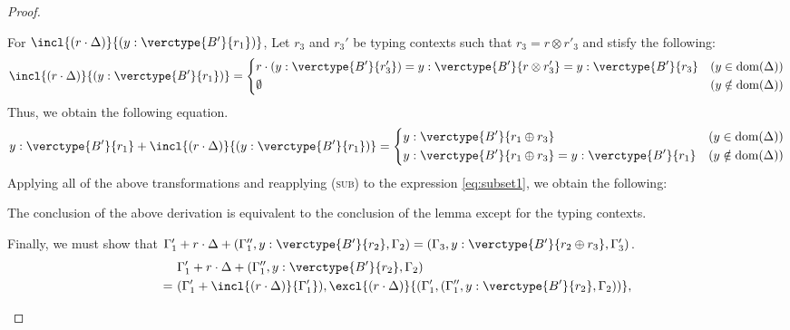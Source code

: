 \begin{proof}
\begin{itemize}
\begin{itemize}
For $\incl{(r\cdot\Delta)}{(y:\verctype{B'}{r_1})}$,  Let $r_3$ and $r_3'$ be typing contexts such that $r_3=r\otimes r'_3$ and stisfy the following:
\begin{align*}
\incl{(r\cdot\Delta)}{(y:\verctype{B'}{r_1})} =
\left\{
\begin{aligned}
    & r\cdot(y:\verctype{B'}{r'_3}) = y:\verctype{B'}{r\otimes r'_3} = y:\verctype{B'}{r_3}  & (y \in \mathrm{dom}(\Delta))\\
    & \emptyset & (y \notin \mathrm{dom}(\Delta))
\end{aligned}
\right.
\end{align*}
Thus, we obtain the following equation.
\begin{align}
\label{eq:subset2}
y:\verctype{B'}{r_1} + \incl{(r\cdot\Delta)}{(y:\verctype{B'}{r_1})} = 
\left\{
\begin{aligned}
    & y:\verctype{B'}{r_1\oplus r_3} & (y \in \mathrm{dom}(\Delta))\\
    & y:\verctype{B'}{r_1\oplus r_3} = y:\verctype{B'}{r_1} & (y \notin \mathrm{dom}(\Delta))
\end{aligned}
\right.
\end{align}
Applying all of the above transformations and reapplying (\textsc{sub}) to the expression \ref{eq:subset1}, we obtain the following:
\begin{center}
    \begin{minipage}{\linewidth}
    \end{minipage}
\end{center}
The conclusion of the above derivation is equivalent to the conclusion of the lemma except for the typing contexts. \par
Finally, we must show that $\Gamma'_1 + r\cdot\Delta + (\Gamma''_1, y:\verctype{B'}{r_2}, \Gamma_2) = (\Gamma_3, y:\verctype{B'}{r_2\oplus r_3}, \Gamma'_3)$.
\begin{align*}
&\Gamma'_1 + r\cdot\Delta + (\Gamma''_1, y:\verctype{B'}{r_2}, \Gamma_2)\\
=\ &(\Gamma'_1+\incl{(r\cdot\Delta)}{\Gamma'_1}),\excl{(r\cdot\Delta)}{(\Gamma'_1,(\Gamma''_1, y:\verctype{B'}{r_2}, \Gamma_2))},\\

\end{align*}
\end{itemize}
\end{itemize}
\end{proof}
